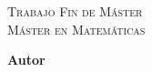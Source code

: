 


\begin{comment}
\usepackage{emptypage}
\renewcommand{\shorthandsspanish}{}
\usepackage[usenames,dvipsnames]{color}
\usepackage[dvipsnames]{xcolor}
\usepackage{multicol}
\usepackage{fancyhdr}
\usepackage{blindtext}
\usepackage{latexsym} 
\usepackage{amsmath}
\usepackage{amssymb}
\usepackage{graphicx}
\usepackage{subfigure}
\usepackage{fourier}
\end{comment}



\begin{titlepage}
	
\AddToShipoutPicture*{\BackgroundPic}
	
	\newlength{\centeroffset}
	\setlength{\centeroffset}{-0.5\oddsidemargin}
	\addtolength{\centeroffset}{0.5\evensidemargin}
	\thispagestyle{empty}

\vspace*{4cm}

	\noindent\hspace*{\centeroffset}\begin{minipage}{\textwidth}
		
		\centering
		
		\textsc{ \huge Trabajo Fin de Máster\\[0.2cm]}
		\medskip
		\textsc{ \Large Máster en Matemáticas}\\[0.8cm]
		
		{\Huge\bfseries \makeatletter \@title \makeatother
		}
		
	\end{minipage}
	
	\vspace{2cm}
	\noindent\hspace*{\centeroffset}\begin{minipage}{\textwidth}
		\centering
		\textbf{\large Autor}\\ {\Large \makeatletter \@author \makeatother}\\[5.5ex]
	\end{minipage}
	

\end{titlepage}
